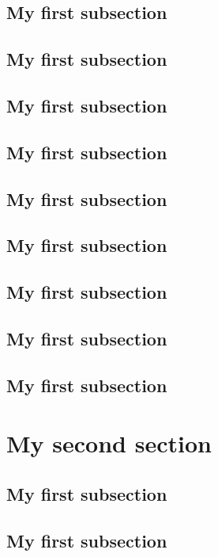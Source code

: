 \documentclass[fontsize=10pt,open=any,twocolumn]{scrbook}[2019/10/12]%
\begin{document}
        \subsection{My first subsection}
            \blindtext
        \subsection{My first subsection}
            \blindtext
        \subsection{My first subsection}
            \blindtext
        \subsection{My first subsection}
            \blindtext
        \subsection{My first subsection}
            \blindtext
        \subsection{My first subsection}
            \blindtext
        \subsection{My first subsection}
            \blindtext
        \subsection{My first subsection}
            \blindtext
        \subsection{My first subsection}
            \blindtext
    \section{My second section}
            \blindtext
        \subsection{My first subsection}
            \blindtext
        \subsection{My first subsection}
            \blindtext     
\end{document}
